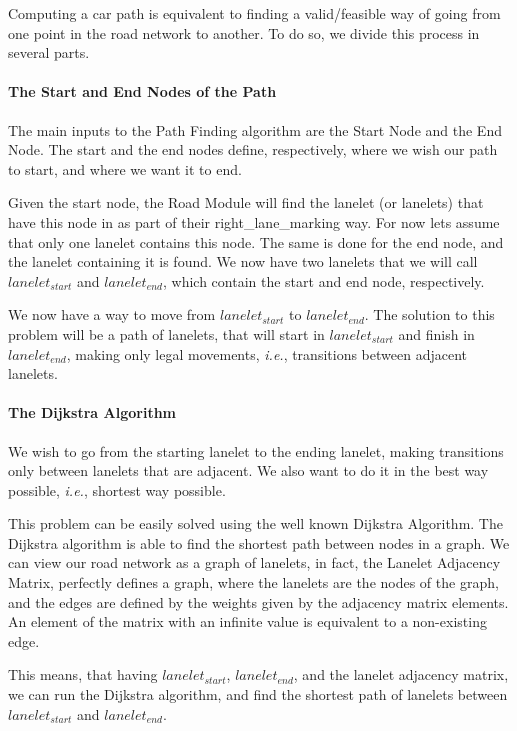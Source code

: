 Computing a car path is equivalent to finding a valid/feasible way of going from one point in the road network to another. To do so, we divide this process in several parts.

\paragraph{The Start and End Nodes of the Path}

The main inputs to the Path Finding algorithm are the Start Node and the End Node. The start and the end nodes define, respectively, where we wish our path to start, and where we want it to end.

Given the start node, the Road Module will find the lanelet (or lanelets) that have this node in as part of their right\_lane\_marking way. For now lets assume that only one lanelet contains this node. The same is done for the end node, and the lanelet containing it is found. We now have two lanelets that we will call $lanelet_{start}$ and $lanelet_{end}$, which contain the start and end node, respectively.

We now have a way to move from $lanelet_{start}$ to $lanelet_{end}$. The solution to this problem will be a path of lanelets, that will start in $lanelet_{start}$ and finish in $lanelet_{end}$, making only legal movements, \textit{i.e.}, transitions between adjacent lanelets.

\paragraph{The Dijkstra Algorithm}

We wish to go from the starting lanelet to the ending lanelet, making transitions only between lanelets that are adjacent. We also want to do it in the best way possible, \textit{i.e.}, shortest way possible. 

This problem can be easily solved using the well known Dijkstra Algorithm. The Dijkstra algorithm is able to find the shortest path between nodes in a graph. We can view our road network as a graph of lanelets, in fact, the Lanelet Adjacency Matrix, perfectly defines a graph, where the lanelets are the nodes of the graph, and the edges are defined by the weights given by the adjacency matrix elements. An element of the matrix with an infinite value is equivalent to a non-existing edge.

This means, that having $lanelet_{start}$, $lanelet_{end}$, and the lanelet adjacency matrix, we can run the Dijkstra algorithm, and find the shortest path of lanelets between $lanelet_{start}$ and $lanelet_{end}$.

